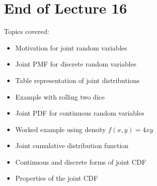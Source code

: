 \documentclass{article}
\begin{document}
\section*{End of Lecture 16}

Topics covered:

\begin{itemize}
\item Motivation for joint random variables
\item Joint PMF for discrete random variables
\item Table representation of joint distributions
\item Example with rolling two dice
\item Joint PDF for continuous random variables
\item Worked example using density $f(x,y)=4xy$
\item Joint cumulative distribution function
\item Continuous and discrete forms of joint CDF
\item Properties of the joint CDF
\end{itemize}
\end{document}

